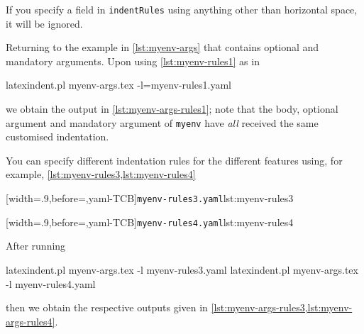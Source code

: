 
	If you specify a field in \texttt{indentRules} using anything other than horizontal
	space, it will be ignored.

	Returning to the example in \cref{lst:myenv-args} that contains optional and mandatory
	arguments. Upon using \cref{lst:myenv-rules1} as in 
	\begin{commandshell}
latexindent.pl myenv-args.tex -l=myenv-rules1.yaml  
\end{commandshell}
	we obtain the output in \cref{lst:myenv-args-rules1}; note that the body, optional
	argument and mandatory argument of \texttt{myenv} have \emph{all} received the same
	customised indentation.

	You can specify different indentation rules for the different features using, for
	example, \cref{lst:myenv-rules3,lst:myenv-rules4}

	\begin{minipage}{.49\textwidth}
		[width=.9\linewidth,before=\centering,yaml-TCB]{\texttt{myenv-rules3.yaml}}{lst:myenv-rules3}
	\end{minipage}
	\hfill
	\begin{minipage}{.49\textwidth}
		[width=.9\linewidth,before=\centering,yaml-TCB]{\texttt{myenv-rules4.yaml}}{lst:myenv-rules4}
	\end{minipage}

	After running 
	\begin{commandshell}
latexindent.pl myenv-args.tex -l myenv-rules3.yaml  
latexindent.pl myenv-args.tex -l myenv-rules4.yaml  
\end{commandshell}
	then we obtain the respective outputs given in
	\cref{lst:myenv-args-rules3,lst:myenv-args-rules4}.

	\begin{widepage}
		\begin{minipage}{.5\textwidth}
		\end{minipage}%
		\hfill
		\begin{minipage}{.5\textwidth}
		\end{minipage}
	\end{widepage}

